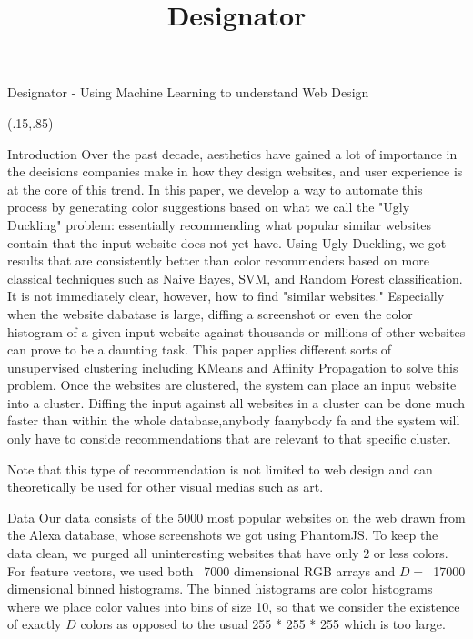 \documentclass{beamer}
\title[Designator]{Designator}
\begin{document}
\begin{frame}{\centerline{\Huge Designator - Using Machine Learning to understand Web Design}}
\begin{textblock}{5}(.15,.85)
\begin{block}{Introduction}
Over the past decade, aesthetics have gained a lot of importance in the decisions companies
make in how they design websites, and user experience is at the core of this trend.  In this paper, we develop a way to automate this process by generating color suggestions based on what we call the "Ugly Duckling" problem: essentially recommending what popular similar websites contain that the input website does not yet have. Using Ugly Duckling, we got results that are consistently better than color recommenders based on more classical techniques such as Naive Bayes, SVM, and Random Forest classification. It is not immediately clear, however, how to find "similar websites." Especially when the website dabatase is large, diffing a screenshot or even the color histogram of a given input website against thousands or millions of other websites can prove to be a daunting task. This paper applies different sorts of unsupervised clustering including KMeans and Affinity Propagation to solve this problem. Once the websites are clustered, the system can place
an input website into a cluster. Diffing the input against all websites in a cluster can be
done much faster than within the whole database,anybody faanybody fa and the system will only have to conside
recommendations that are relevant to that specific cluster.

Note that this type of recommendation is not limited to web design and can theoretically be used for other visual medias such as art.
\end{block}

\begin{block}{Data}
Our data consists of the 5000 most popular websites on the web drawn from the Alexa database, whose screenshots we got using PhantomJS. To keep the data clean, we purged all uninteresting websites that have only 2 or less colors. For feature vectors, we used both ~7000 dimensional RGB arrays and $D=$~17000 dimensional binned histograms. The binned histograms are color histograms where we place color values into bins of size 10, so that we consider the existence of exactly $D$ colors as opposed to the usual 255 * 255 * 255 which is too large.
\end{block}


\end{textblock}
\end{frame}
\end{document}
